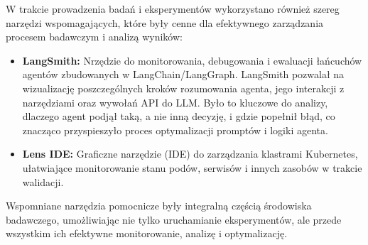 W trakcie prowadzenia badań i eksperymentów wykorzystano również szereg narzędzi wspomagających, które były cenne dla efektywnego zarządzania procesem badawczym i analizą wyników:
\begin{itemize}
	\item \textbf{LangSmith:} \cite{langsmith} Nrzędzie do monitorowania, debugowania i ewaluacji łańcuchów agentów zbudowanych w LangChain/LangGraph. LangSmith pozwalał na wizualizację poszczególnych kroków rozumowania agenta, jego interakcji z narzędziami oraz wywołań API do LLM. Było to kluczowe do analizy, dlaczego agent podjął taką, a nie inną decyzję, i gdzie popełnił błąd, co znacząco przyspieszyło proces optymalizacji promptów i logiki agenta.
	\item \textbf{Lens IDE:} \cite{lens_ide} Graficzne narzędzie (IDE) do zarządzania klastrami Kubernetes, ułatwiające monitorowanie stanu podów, serwisów i innych zasobów w trakcie walidacji.
\end{itemize}
Wspomniane narzędzia pomocnicze były integralną częścią środowiska badawczego, umożliwiając nie tylko uruchamianie eksperymentów, ale przede wszystkim ich efektywne monitorowanie, analizę i optymalizację.
